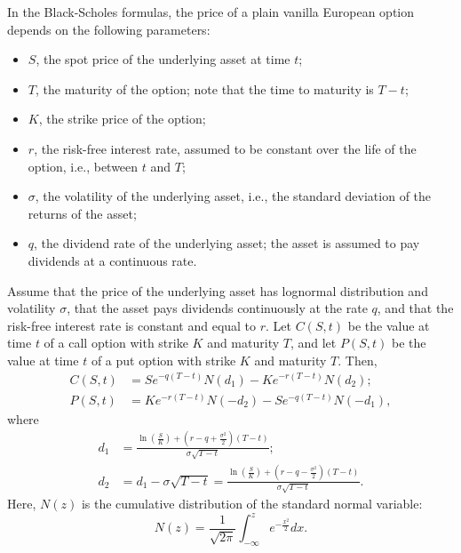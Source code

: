 In the Black-Scholes formulas, the price of a plain vanilla European option
    depends on the following parameters:
\begin{itemize}
    \item $ S $, the spot price of the underlying asset at time $ t $;
    \item $ T $, the maturity of the option; note that the time to maturity is
        $ T - t $;
    \item $ K $, the strike price of the option;
    \item $ r $, the risk-free interest rate, assumed to be constant over the
        life of the option, i.e., between $ t $ and $ T $;
    \item $ \sigma $, the volatility of the underlying asset, i.e., the standard
        deviation of the returns of the asset;
    \item $ q $, the dividend rate of the underlying asset; the asset is assumed
        to pay dividends at a continuous rate.
\end{itemize}
Assume that the price of the underlying asset has lognormal distribution and
    volatility $ \sigma $, that the asset pays dividends continuously at the
    rate $ q $, and that the risk-free interest rate is constant and equal to
    $ r $.
Let $ C(S,t) $ be the value at time $ t $ of a call option with strike $ K $
    and maturity $ T $, and let $ P(S,t) $ be the value at time $ t $ of a put
    option with strike $ K $ and maturity $ T $.
Then,
\begin{align}
    C(S, t) &= S e^{-q (T - t)} N(d_1) - Ke^{-r (T - t)} N(d_2);
    \label{eq:black-scholes-call} \\
    P(S, t) &= K e^{-r (T - t)} N(-d_2) - S e^{-q (T - t)} N(-d_1),
    \label{eq:black-scholes-put}
\end{align}
where
\begin{align}
    d_1 &= \frac{\ln \left( \frac{S}{K} \right) + \left( r - q +
        \frac{\sigma^2}{2} \right) (T - t)}{\sigma \sqrt{T - t}};
    \label{eq:black-scholes-drift-1} \\
    d_2 &= d_1 - \sigma \sqrt{T - t} = \frac{\ln \left( \frac{S}{K} \right) +
        \left( r - q - \frac{\sigma^2}{2} \right) (T - t)}{\sigma \sqrt{T - t}}.
    \label{eq:black-scholes-drift-2}
\end{align}
Here, $ N(z) $ is the cumulative distribution of the standard normal variable:
\begin{equation*}
    N(z) = \frac{1}{\sqrt{2 \pi}} \int_{-\infty}^{z} e^{-\frac{x^2}{2}} dx.
\end{equation*}

